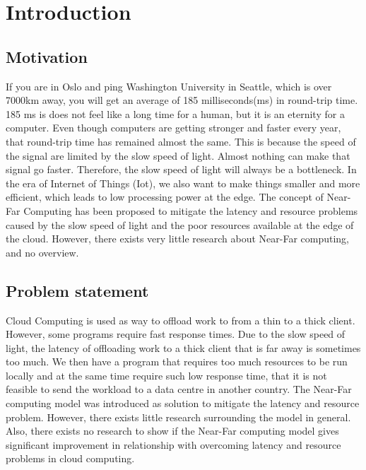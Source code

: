 \chapter{Introduction}   %


\section{Motivation}
If you are in Oslo and ping Washington University in Seattle, which is over 7000km away,  you will get an average of 185 milliseconds(ms) in round-trip time. 185 ms is does not feel like a long time for a human, but it is an eternity for a computer. Even though computers are getting stronger and faster every year, that round-trip time has remained almost the same. This is because the speed of the signal are limited by the slow speed of light. Almost nothing can make that signal go faster. Therefore, the slow speed of light will always be a bottleneck. In the era of Internet of Things (Iot), we also want to make things smaller and more efficient, which leads to low processing power at the edge. The concept of Near-Far Computing has been proposed to mitigate the latency and resource problems caused by the slow speed of light and the poor resources available at the edge of the cloud. However, there exists very little research about Near-Far computing, and no overview.



\section{Problem statement}         %
Cloud Computing is used as way to offload work to from a thin to a thick client. However, some programs require fast response times. Due to the slow speed of light, the latency of offloading work to a thick client that is far away is sometimes too much. We then have a program that requires too much resources to be run locally and at the same time require such low response time, that it is not feasible to send the workload to a data centre in another country. The Near-Far computing model was introduced as solution to mitigate the latency and resource problem. However, there exists little research surrounding the model in general. Also, there exists no research to show if the Near-Far computing model gives significant improvement in relationship with overcoming latency and resource problems in cloud computing.


